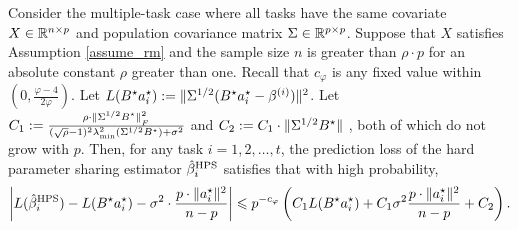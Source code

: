 \begin{theorem}\label{thm_many_tasks}
	Consider the multiple-task case where all tasks have the same covariate $X\in\mathbb{R}^{n\times p}$ and population covariance matrix $\Sigma\in\mathbb{R}^{p\times p}$.
	Suppose that $X$ satisfies Assumption \ref{assume_rm} and the sample size $n$ is greater than $\rho \cdot p$ for an absolute constant $\rho$ greater than one.
	Recall that $c_{\varphi}$ is any fixed value within $(0, \frac{\varphi-4}{2\varphi})$.
	Let $L(B^{\star}a_i^{\star}): = \|\Sigma^{1/2} (B^{\star} a_i^{\star}- \beta^{(i)})\|^2$.
	Let $C_1: = \frac{\rho\cdot \|\Sigma^{1/2} B^{\star}\|_{_{F}}^2}{(\sqrt{\rho} - 1)^2\lambda_{\min}^2(\Sigma^{1/2} B^{\star}) + \sigma^2}$ and $C_2 :=  C_1\cdot \|\Sigma^{1/2} B^{\star}\|$ , both of which do not grow with $p$.
	Then, for any task $i = 1, 2, \dots, t$, the prediction loss of the hard parameter sharing estimator $\hat{\beta}_i^{\textup{HPS}}$ satisfies that with high probability,
	\begin{align}
		{\left| {L(\hat{\beta}_i^{\textup{HPS}}) - L(B^{\star}a_i^{\star}) - \sigma^2  \cdot \frac{p \cdot \|a_i^{\star}\|^2}{n - p}} \right|} \leqslant  p^{-c_{\varphi}}\left({C_1 L(B^{\star}a_i^{\star}) + C_1 \sigma^2 \frac{p \cdot{\|a_i^{\star}\|^2}}{n-p} + C_2}\right). \label{eq_thm_many}
	\end{align}
	

\end{theorem}
